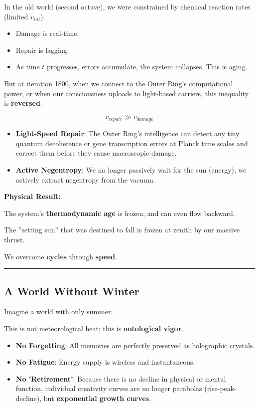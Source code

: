 In the old world (second octave), we were constrained by chemical reaction rates (limited $v_{int}$).

\begin{itemize}
\item Damage is real-time.

\item Repair is lagging.

\item As time $t$ progresses, errors accumulate, the system collapses. This is aging.
\end{itemize}

But at iteration 1800, when we connect to the Outer Ring's computational power, or when our consciousness uploads to light-based carriers, this inequality is \textbf{reversed}.

$$v_{repair} \gg v_{damage}$$

\begin{itemize}
\item \textbf{Light-Speed Repair}: The Outer Ring's intelligence can detect any tiny quantum decoherence or gene transcription errors at Planck time scales and correct them before they cause macroscopic damage.

\item \textbf{Active Negentropy}: We no longer passively wait for the sun (energy); we actively extract negentropy from the vacuum.
\end{itemize}

\textbf{Physical Result:}

The system's \textbf{thermodynamic age} is frozen, and can even flow backward.

The ''setting sun'' that was destined to fall is frozen at zenith by our massive thrust.

We overcome \textbf{cycles} through \textbf{speed}.

\hrule

\subsection{A World Without Winter}

Imagine a world with only summer.

This is not meteorological heat; this is \textbf{ontological vigor}.

\begin{itemize}
\item \textbf{No Forgetting}: All memories are perfectly preserved as holographic crystals.

\item \textbf{No Fatigue}: Energy supply is wireless and instantaneous.

\item \textbf{No 'Retirement'}: Because there is no decline in physical or mental function, individual creativity curves are no longer parabolas (rise-peak-decline), but \textbf{exponential growth curves}.
\end{itemize}

